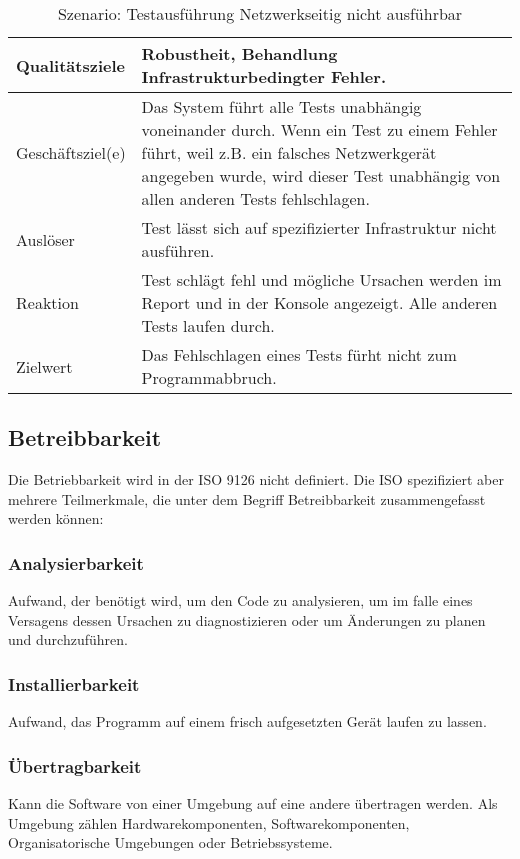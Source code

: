 \documentclass[
	ngerman,
	toc=listof, %
	toc=bibliography, %
	footnotes=multiple, %
	parskip=half, %
	numbers=noendperiod %
]{scrartcl}
\begin{document}
		\begin{table}[!h]
			\begin{tabularx}{\textwidth}{lX}
				\toprule
				Qualitätsziele & Robustheit, Behandlung Infrastrukturbedingter Fehler.  \\
				\midrule
				Geschäftsziel(e) & Das System führt alle Tests unabhängig voneinander durch. Wenn ein Test zu einem Fehler führt, weil z.B. ein falsches Netzwerkgerät angegeben wurde, wird dieser Test unabhängig von allen anderen Tests fehlschlagen.  \\
				\midrule
				Auslöser & Test lässt sich auf spezifizierter Infrastruktur nicht ausführen.  \\
				\midrule
				Reaktion & Test schlägt fehl und mögliche Ursachen werden im Report und in der Konsole angezeigt. Alle anderen Tests laufen durch.  \\
				\midrule
				Zielwert & Das Fehlschlagen eines Tests fürht nicht zum Programmabbruch.  \\
				\bottomrule
			\end{tabularx}
			\caption{Szenario: Testausführung Netzwerkseitig nicht ausführbar}
		\end{table}
		

	\subsection{Betreibbarkeit}
	Die Betriebbarkeit wird in der ISO 9126 nicht definiert. Die ISO spezifiziert aber mehrere Teilmerkmale, die unter dem Begriff Betreibbarkeit zusammengefasst werden können:

		\subsubsection{Analysierbarkeit}
		Aufwand, der benötigt wird, um den Code zu analysieren, um im falle eines Versagens dessen Ursachen zu diagnostizieren oder um Änderungen zu planen und durchzuführen.

		\subsubsection{Installierbarkeit}
		Aufwand, das Programm auf einem frisch aufgesetzten Gerät laufen zu lassen.

		\subsubsection{Übertragbarkeit}
		Kann die Software von einer Umgebung auf eine andere übertragen werden. 
		Als Umgebung zählen Hardwarekomponenten, Softwarekomponenten, Organisatorische Umgebungen oder Betriebssysteme. 
\end{document}
